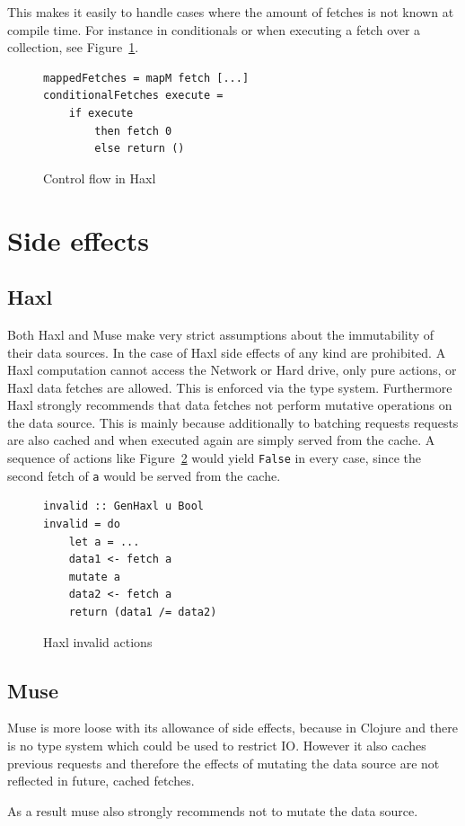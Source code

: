 This makes it easily to handle cases where the amount of fetches is not known at compile time.
For instance in conditionals or when executing a fetch over a collection, see Figure~\ref{fig:control-flow-in-haxl}.

\begin{figure}
\begin{verbatim}
mappedFetches = mapM fetch [...]
conditionalFetches execute =
    if execute
        then fetch 0
        else return ()
\end{verbatim}
\caption{Control flow in Haxl}
\label{fig:control-flow-in-haxl}
\end{figure}

\section{Side effects}

\subsection{Haxl}

Both Haxl and Muse make very strict assumptions about the immutability of their data sources.
In the case of Haxl side effects of any kind are prohibited.
A Haxl computation cannot access the Network or Hard drive, only pure actions, or Haxl data fetches are allowed.
This is enforced via the type system.
Furthermore Haxl strongly recommends that data fetches not perform mutative operations on the data source.
This is mainly because additionally to batching requests requests are also cached and when executed again are simply served from the cache.
A sequence of actions like Figure~\ref{fig:haxl-invalid-actions} would yield \texttt{False} in every case, since the second fetch of \texttt{a} would be served from the cache.

\begin{figure}
\begin{verbatim}
invalid :: GenHaxl u Bool
invalid = do
    let a = ...
    data1 <- fetch a
    mutate a
    data2 <- fetch a
    return (data1 /= data2)
\end{verbatim}
\caption{Haxl invalid actions}
\label{fig:haxl-invalid-actions}
\end{figure}

\subsection{Muse}

Muse is more loose with its allowance of side effects, because in Clojure and there is no type system which could be used to restrict IO.
However it also caches previous requests and therefore the effects of mutating the data source are not reflected in future, cached fetches.

As a result muse also strongly recommends not to mutate the data source.

